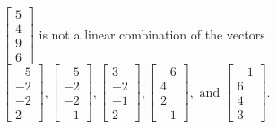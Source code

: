 \begin{exercise}
\begin{exerciseStatement}
  \end{exerciseStatement}
  \begin{exerciseAnswer}
   \(\left[\begin{array}{c}
5 \\
4 \\
9 \\
6
\end{array}\right]\) 
  	 is not  
	a linear combination of the vectors \(\left[\begin{array}{c}
-5 \\
-2 \\
-2 \\
2
\end{array}\right] , \left[\begin{array}{c}
-5 \\
-2 \\
-2 \\
-1
\end{array}\right] , \left[\begin{array}{c}
3 \\
-2 \\
-1 \\
2
\end{array}\right] , \left[\begin{array}{c}
-6 \\
4 \\
2 \\
-1
\end{array}\right] , \text{ and } \left[\begin{array}{c}
-1 \\
6 \\
4 \\
3
\end{array}\right]\).

	
  


  \end{exerciseAnswer}
\end{exercise}